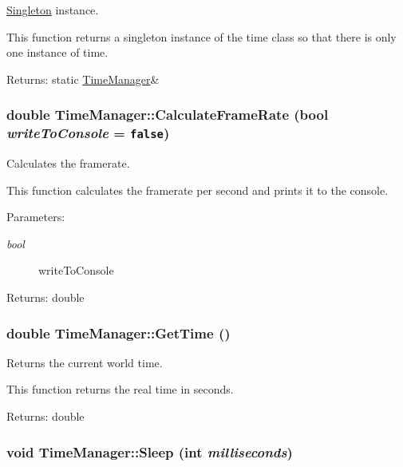 \hyperlink{class_singleton}{Singleton} instance. 

This function returns a singleton instance of the time class so that there is only one instance of time.

\begin{Desc}
\item[Returns:]static \hyperlink{class_time_manager}{TimeManager}\& \end{Desc}
\hypertarget{class_time_manager_95782501e884a42904e2e726246701d5}{
\subsubsection[CalculateFrameRate]{\setlength{\rightskip}{0pt plus 5cm}double TimeManager::CalculateFrameRate (bool {\em writeToConsole} = {\tt false})}}
\label{class_time_manager_95782501e884a42904e2e726246701d5}


Calculates the framerate. 

This function calculates the framerate per second and prints it to the console.

\begin{Desc}
\item[Parameters:]
\begin{description}
\item[{\em bool}]writeToConsole \end{description}
\end{Desc}
\begin{Desc}
\item[Returns:]double \end{Desc}
\hypertarget{class_time_manager_7ba98f4d4ea9a0519007d127a460b259}{
\subsubsection[GetTime]{\setlength{\rightskip}{0pt plus 5cm}double TimeManager::GetTime ()}}
\label{class_time_manager_7ba98f4d4ea9a0519007d127a460b259}


Returns the current world time. 

This function returns the real time in seconds.

\begin{Desc}
\item[Returns:]double \end{Desc}
\hypertarget{class_time_manager_a2273e7e9e31462ae81b2331fe8e7ac6}{
\subsubsection[Sleep]{\setlength{\rightskip}{0pt plus 5cm}void TimeManager::Sleep (int {\em milliseconds})}}
\label{class_time_manager_a2273e7e9e31462ae81b2331fe8e7ac6}


